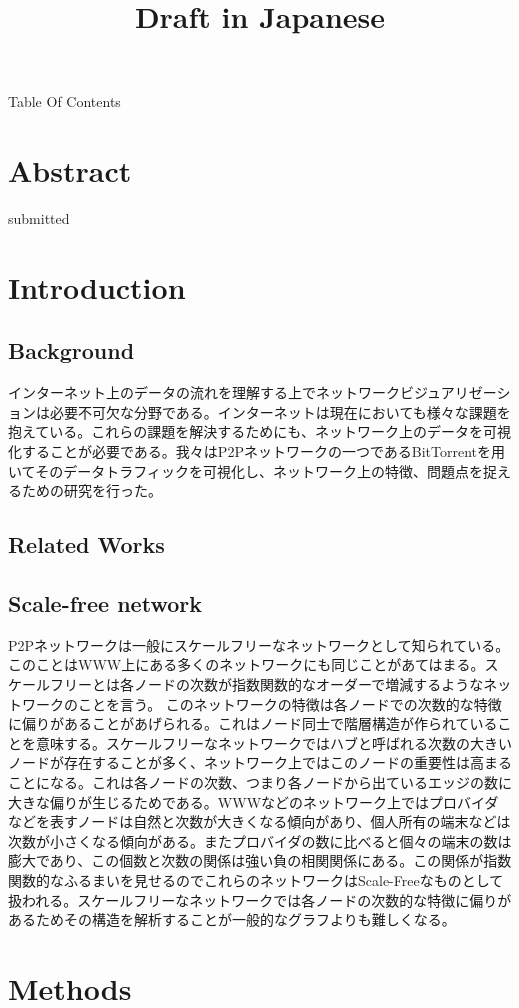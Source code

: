 \documentclass{jsarticle}
\title{Draft in Japanese}
\begin{document}
\begin{center}{\Huge Table Of Contents}\end{center}
\section{Abstract}
submitted
\section{Introduction}
\subsection{Background}
インターネット上のデータの流れを理解する上でネットワークビジュアリゼーションは必要不可欠な分野である。インターネットは現在においても様々な課題を抱えている。これらの課題を解決するためにも、ネットワーク上のデータを可視化することが必要である。我々はP2Pネットワークの一つであるBitTorrentを用いてそのデータトラフィックを可視化し、ネットワーク上の特徴、問題点を捉えるための研究を行った。
\subsection{Related Works}
\subsection{Scale-free network}
P2Pネットワークは一般にスケールフリーなネットワークとして知られている。このことはWWW上にある多くのネットワークにも同じことがあてはまる。スケールフリーとは各ノードの次数が指数関数的なオーダーで増減するようなネットワークのことを言う。\cite{scale-free} このネットワークの特徴は各ノードでの次数的な特徴に偏りがあることがあげられる。これはノード同士で階層構造が作られていることを意味する。スケールフリーなネットワークではハブと呼ばれる次数の大きいノードが存在することが多く、ネットワーク上ではこのノードの重要性は高まることになる。これは各ノードの次数、つまり各ノードから出ているエッジの数に大きな偏りが生じるためである。WWWなどのネットワーク上ではプロバイダなどを表すノードは自然と次数が大きくなる傾向があり、個人所有の端末などは次数が小さくなる傾向がある。またプロバイダの数に比べると個々の端末の数は膨大であり、この個数と次数の関係は強い負の相関関係にある。この関係が指数関数的なふるまいを見せるのでこれらのネットワークはScale-Freeなものとして扱われる。スケールフリーなネットワークでは各ノードの次数的な特徴に偏りがあるためその構造を解析することが一般的なグラフよりも難しくなる。
\section{Methods}
\end{document}
